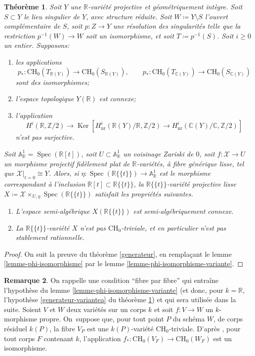 \documentclass[JEP,XML,SOM,Unicode,francais,published]{cedram}
\newenvironment{enumeratei}
{\bgroup\def\theenumi{\roman{enumi}}\def\theenumii{\arabic{enumii}}\begin{enumerate}}
{\end{enumerate}\egroup}
\newenvironment{enumeratea}
{\bgroup\def\theenumi{\alph{enumi}}\begin{enumerate}}
{\end{enumerate}\egroup}
\newcommand{\CH}{\mathrm{CH}}
\newtheorem{thm}{Théorème}[section]
\theoremstyle{definition}
\newtheorem{rmk}[thm]{Remarque}
\newcommand{\C}{\mathbb C}
\newcommand{\Z}{\mathbb Z}
\newcommand{\R}{\mathbb R}
\newcommand{\A}{\mathbb A}
\newcommand{\Spec}{\operatorname{Spec}}
\newcommand{\Ker}{\operatorname{Ker}}
\newcommand{\mc}[1]{\mathcal{#1}}
\newcommand{\on}[1]{\operatorname{#1}}
\newcommand{\puiseux}{\mathbb{R}\{\!\{t\}\!\}}
\begin{document}
\begin{thm}\label{generateur-variante}
Soit $Y$ une $\R$-variété projective et géométriquement intègre. Soit $S\subset Y$ le lieu singulier de $Y$, avec structure réduite. Soit $W\coloneqq Y\setminus S$ l'ouvert complémentaire de $S$, soit $p\colon Z\to Y$ une résolution des singularités telle que la restriction $p^{-1}(W)\to W$ soit un isomorphisme, et soit $T\coloneqq p^{-1}(S)$. Soit $i\geq 0$ un entier. Supposons:

\begin{enumeratea}
\item\label{generateur-variantea}
les applications
\[p_*\colon \CH_0(T_{\R(Y)})\to \CH_0(S_{\R(Y)}),\qquad p_*\colon \CH_0(T_{\C(Y)})\to \CH_0(S_{\C(Y)})\] sont des isomorphismes;
\item\label{generateur-varianteb}
l'espace topologique $Y(\R)$ est connexe;
\item\label{generateur-variantec}
l'application
\[H^i(\R,\Z/2) \to \Ker [H^i_{\on{nr}}(\R(Y)/\R,\Z/2) \to H^i_{\on{nr}}(\C(Y)/\C,\Z/2)]\] n'est pas surjective.
\end{enumeratea}

Soit $\A^1_\R=\Spec(\R[t])$, soit $U\subset \A^1_\R$ un voisinage Zariski de $0$, soit $f\colon \mc{X}\to U$ un morphisme projectif fidèlement plat de $\R$-variétés, à fibre générique lisse, tel que $\mc{X}|_{t=0}\cong Y$. Alors, si $\eta\colon \Spec(\puiseux)\to\A^1_\R$ est le morphisme correspondant à l'inclusion $\R[t]\subset \puiseux$, la $\puiseux$-variété projective lisse $X\coloneqq \mc{X}\times_{U,\eta}\Spec(\puiseux)$ satisfait les propriétés suivantes.

\begin{enumeratei}
\item\label{generateur-variantei}
L'espace semi-algébrique $X(\puiseux)$ est semi-algébriquement connexe.
\item\label{generateur-varianteii}
La $\puiseux$-variété $X$ n'est pas $\CH_0$-triviale, et en particulier
n'est pas stablement rationnelle.
\end{enumeratei}
\end{thm}

\begin{proof}
On suit la preuve du théorème \ref{generateur}, en remplaçant le lemme \ref{lemme-phi-isomorphisme} par le lemme \ref{lemme-phi-isomorphisme-variante}.
\end{proof}

\begin{rmk}\label{fibre-par-fibre}
On rappelle une condition \enquote{fibre par fibre} qui entraîne l'hypothèse du lemme \ref{lemme-phi-isomorphisme-variante} (et donc, pour $k=\R$, l'hypothèse \eqref{generateur-variantea} du théorème \ref{generateur-variante}) et qui sera utilisée dans la suite. Soient $V$ et $W$ deux variétés sur un corps $k$ et soit $f\colon V\to W$ un $k$-morphisme propre. On~suppose que, pour tout point $P$ du schéma $W$, de corps résiduel $k(P)$, la fibre $V_P$ est une $k(P)$-variété $\CH_0$-triviale. D'après \cite[Prop.\,1.8]{colliot2016hypersurfaces}, pour tout corps $F$ contenant $k$, l'application $f_*\colon \CH_0(V_F)\to \CH_0(W_F)$ est un isomorphisme.
\end{rmk}
\end{document}
